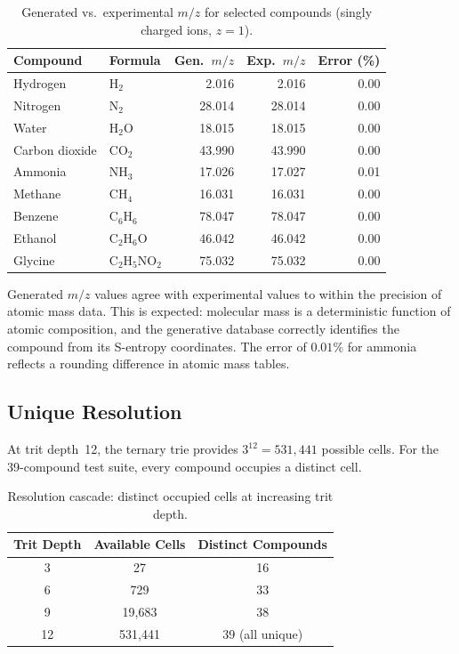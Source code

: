 \begin{table}[htbp]
\centering
\caption{Generated vs.\ experimental $m/z$ for selected compounds
         (singly charged ions, $z = 1$).}
\label{tab:ch23-gen-exp}
\begin{tabular}{@{}llrrr@{}}
\toprule
\textbf{Compound} & \textbf{Formula} & \textbf{Gen.\ $m/z$} &
  \textbf{Exp.\ $m/z$} & \textbf{Error (\%)} \\
\midrule
Hydrogen         & H$_2$              &  2.016 &  2.016 & 0.00 \\
Nitrogen         & N$_2$              & 28.014 & 28.014 & 0.00 \\
Water            & H$_2$O             & 18.015 & 18.015 & 0.00 \\
Carbon dioxide   & CO$_2$             & 43.990 & 43.990 & 0.00 \\
Ammonia          & NH$_3$             & 17.026 & 17.027 & 0.01 \\
Methane          & CH$_4$             & 16.031 & 16.031 & 0.00 \\
Benzene          & C$_6$H$_6$         & 78.047 & 78.047 & 0.00 \\
Ethanol          & C$_2$H$_6$O        & 46.042 & 46.042 & 0.00 \\
Glycine          & C$_2$H$_5$NO$_2$   & 75.032 & 75.032 & 0.00 \\
\bottomrule
\end{tabular}
\end{table}

Generated $m/z$ values agree with experimental values to within the precision
of atomic mass data.  This is expected: molecular mass is a deterministic
function of atomic composition, and the generative database correctly
identifies the compound from its S-entropy coordinates.  The error of $0.01\%$
for ammonia reflects a rounding difference in atomic mass tables.

\subsection{Unique Resolution}
\label{sec:ch23-resolution}

At trit depth~12, the ternary trie provides $3^{12} = 531{,}441$ possible
cells.  For the 39-compound test suite, every compound occupies a distinct
cell.

\begin{table}[htbp]
\centering
\caption{Resolution cascade: distinct occupied cells at increasing trit depth.}
\label{tab:ch23-cascade}
\begin{tabular}{@{}ccc@{}}
\toprule
\textbf{Trit Depth} & \textbf{Available Cells} & \textbf{Distinct Compounds} \\
\midrule
 3 & 27           &  16 \\
 6 & 729          &  33 \\
 9 & 19{,}683     &  38 \\
12 & 531{,}441    &  39 (all unique) \\
\bottomrule
\end{tabular}
\end{table}

